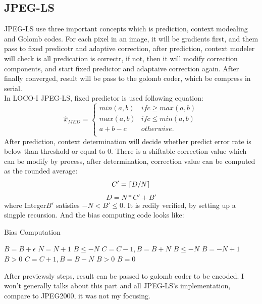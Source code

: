 \documentclass[UTF8, letterpaper, 14pt]{article}
\DeclarePairedDelimiter\ceil{\lceil}{\rceil}
\begin{document}
\subsection{JPEG-LS}
JPEG-LS use three important concepts which is prediction, context modealing and Golomb codes. For each pixel in an image, it will be gradients first, and them pass to fixed predicotr and adaptive correction, after prediction, context modeler will check is all predication is correctr, if not, then it will modify correction components, and start fixed predictor and adaptaive correction again. After finally converged, result will be pass to the golomb coder, which be compress in serial.\\
In LOCO-I JPEG-LS, fixed predictor is used following equation\cite{locol}\cite{locol2}:\\
\[
\hat{x}_{MED} =
\begin{cases}
min(a,b) & if c \geq max(a,b) \\
max(a,b) & if c \leq min(a,b) \\
a+b-c & otherwise. \\
\end{cases}
\]
After prediction, context determination will decide whether predict error rate is below than threshold or equal to 0. There is a shiftable correction value which can be modify by process, after determination, correction value can be computed as the rounded average\cite{locol}:\\
\[
C' =
\ceil{D/N}
\]
\[
D=N*C' +B'
\] where Integer$B'$ satisfies $-N < B' \leq 0$. It is redily verified, by setting up a singple recursion. And the bias computing code looks like:
\begin{spacing}{0.7}
\begin{algorithm}[htb]
\caption{Bias Computation}
   \begin{algorithmic}[1]
   \State $B=B+\epsilon$ 
   \State $N=N+1$ 
   \If $ B\leq -N$
   		\State $C=C-1, B=B+N$
   		\If $B \leq -N$
   			\State $ B=-N+1$
   		\EndIf
   	\ElsIf $B>0$
   		\State $C=C+1, B=B-N$
   		\If $B > 0$
   			\State $ B=0$
   		\EndIf
   	\EndIf
\end{algorithmic}
\end{algorithm}
\end{spacing}
After previewsly steps, result can be passed to golomb coder to be encoded. I won't generally talks about this part and all JPEG-LS's implementation, compare to JPEG2000, it was not my focusing. 
\end{document}
